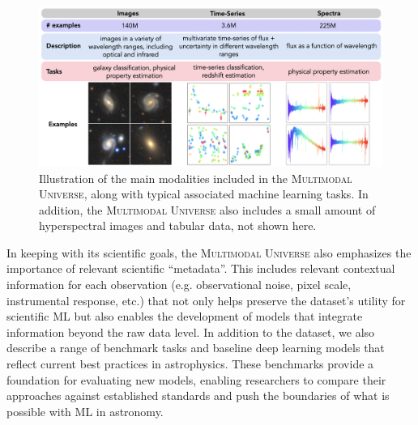 \documentclass[dvipsnames,table]{article}
\newcommand\pile{\textsc{Multimodal Universe}\xspace}
\begin{document}
\begin{figure}
    \centering
    \includegraphics[scale=0.3]{paper/figures/dataset_examples.png}
    \caption{\small Illustration of the main modalities included in the \pile, along with typical associated machine learning tasks. In addition, the \pile also includes a small amount of hyperspectral images and tabular data, not shown here.}
    \label{fig:examples}
\end{figure}

In keeping with its scientific goals, the \pile also emphasizes the importance of relevant scientific ``metadata''. This includes relevant contextual information for each observation (e.g. observational noise, pixel scale, instrumental response, etc.) that not only helps preserve the dataset's utility for scientific ML but also enables the development of models that integrate information beyond the raw data level. In addition to the dataset, we also describe a range of benchmark tasks and baseline deep learning models that reflect current best practices in astrophysics. These benchmarks provide a foundation for evaluating new models, enabling researchers to compare their approaches against established standards and push the boundaries of what is possible with ML in astronomy.
\end{document}
